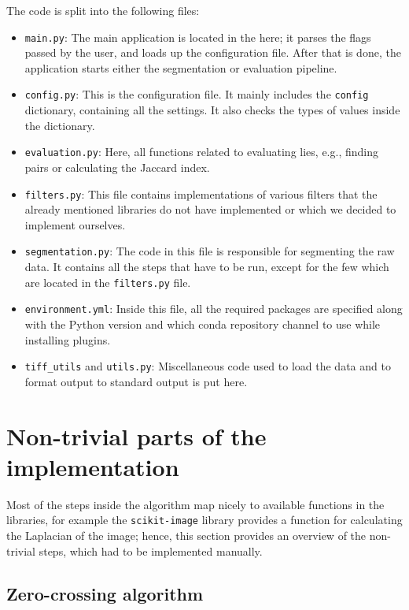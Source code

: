 \documentclass[
  digital,     %
  oneside,     %
  nosansbold,  %
  nocolorbold, %
  lof,         %
  lot,         %
]{fithesis4}
\begin{document}
The code is split into the following files: 
\begin{itemize}
    \item \texttt{main.py}: The main application is located in the
        here; it parses the flags passed by the user, and loads
        up the configuration file. After that is done, the application starts
        either the segmentation or evaluation pipeline.
    \item \texttt{config.py}: This is the configuration file. It mainly includes
        the \texttt{config} dictionary, containing all the settings. It also
        checks the types of values inside the dictionary.
    \item \texttt{evaluation.py}: Here, all functions related to evaluating
        lies, e.g., finding pairs or calculating the Jaccard index.
    \item \texttt{filters.py}: This file contains implementations of various
        filters that the already mentioned libraries do not have implemented
        or which we decided to implement ourselves.
    \item \texttt{segmentation.py}: The code in this file is responsible for
        segmenting the raw data. It contains all the steps that have to be
        run, except for the few which are located in the \texttt{filters.py}
        file.
    \item \texttt{environment.yml}: Inside this file, all the required packages
        are specified along with the Python version and which conda repository 
        channel to use while installing plugins.
    \item \texttt{tiff\_utils} and \texttt{utils.py}: Miscellaneous code used
        to load the data and to format output to standard output is put here.
\end{itemize}

\section{Non-trivial parts of the implementation}
Most of the steps inside the algorithm map nicely to available functions in the
libraries, for example the \texttt{scikit-image} library provides a function for
calculating the Laplacian of the image; hence, this section provides an overview of
the non-trivial steps, which had to be implemented manually.

\subsection{Zero-crossing algorithm}
\end{document}
